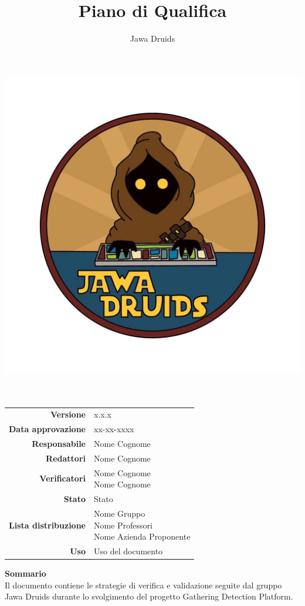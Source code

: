 



	
	\makeatletter
	\begin{titlepage}
		\begin{center}
			\vspace*{-4,0cm}
			\author{Jawa Druids} 
			\title{Piano di Qualifica}
			\date{} %
			\includegraphics[width=0.7\linewidth]{../immagini/DRUIDSLOGO.jpg}\\[4ex]
			{\huge \bfseries  \@title }\\[2ex] 
			{\LARGE  \@author}\\[50ex]
			\vspace*{-8,5cm}
			\begin{table}[H]
				\renewcommand{\arraystretch}{1.4}
				\centering
				\begin{tabular}{r | l}
					\textbf{Versione} & x.x.x \\%
					\textbf{Data approvazione} & xx-xx-xxxx\\
					\textbf{Responsabile} & Nome Cognome\\
					\textbf{Redattori} & Nome Cognome \\ 
					\textbf{Verificatori} & \makecell[tl]{Nome Cognome \\ Nome Cognome} \\
					\textbf{Stato} & Stato\\
					\textbf{Lista distribuzione} & \makecell[tl]{Nome Gruppo \\ Nome Professori \\ Nome Azienda Proponente}\\
					\textbf{Uso} & Uso del documento            
				\end{tabular}
			\end{table}
			\vspace{0.1cm}
			\hfill \break
			\fontsize{17}{10}\textbf{Sommario} \\
			\vspace{0.1cm}
			Il documento contiene le strategie di verifica e validazione seguite dal gruppo Jawa Druids durante lo svolgimento del progetto Gathering Detection Platform.
		\end{center}
	\end{titlepage}
	\makeatother
	
	
	\tableofcontents{}
	
	
	
	

